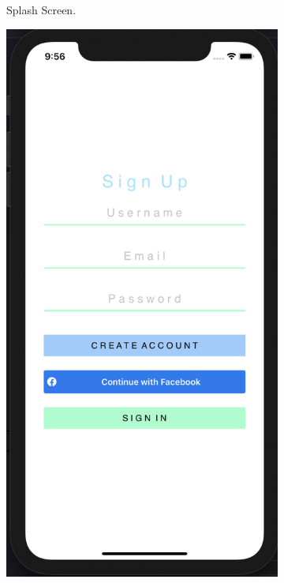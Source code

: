 \begin{figure}[H]
\begin{subfigure}[b]{0.3\textwidth}
        \caption{Splash Screen.}
        \label{fig:splash_app}
    \end{subfigure}
    \hfill
    \begin{subfigure}[b]{0.3\textwidth}
        \centering
        \includegraphics[width=\textwidth]{./graphics/Implementation/Splash_Sign_Up_Sign_In/signup.png}

\end{subfigure}
\end{figure}
